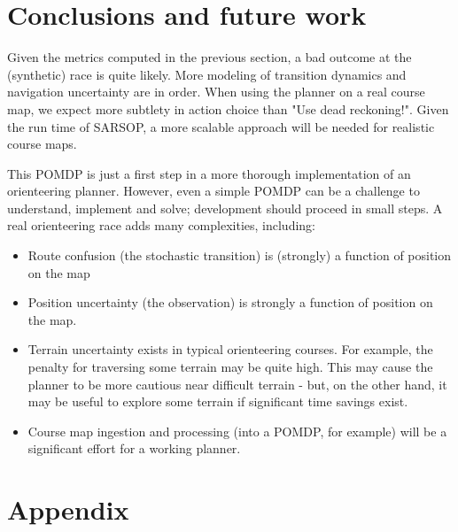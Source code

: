 \documentclass[twoside,11pt]{article}
\begin{document}
\section{Conclusions and future work}

Given the metrics computed in the previous section, a bad outcome at the (synthetic) race is quite likely. More modeling of transition dynamics and navigation uncertainty are in order. When using the planner on a real course map, we expect more subtlety in action choice than "Use dead reckoning!". Given the run time of SARSOP, a more scalable approach will be needed for realistic course maps.

This POMDP is just a first step in a more thorough implementation of an orienteering planner. However, even a simple POMDP can be a challenge to understand, implement and solve; development should proceed in small steps. A real orienteering race adds many complexities, including:

\begin{itemize}[noitemsep, topsep=0pt]
\item Route confusion (the stochastic transition) is (strongly) a function of position on the map
\item Position uncertainty (the observation) is strongly a function of position on the map.
\item Terrain uncertainty exists in typical orienteering courses. For example, the penalty for traversing some terrain may be quite high. This may cause the planner to be more cautious near difficult terrain - but, on the other hand, it may be useful to explore some terrain if significant time savings exist.
\item Course map ingestion and processing (into a POMDP, for example) will be a significant effort for a working planner. 
\end{itemize}




\section{Appendix}
\end{document}
